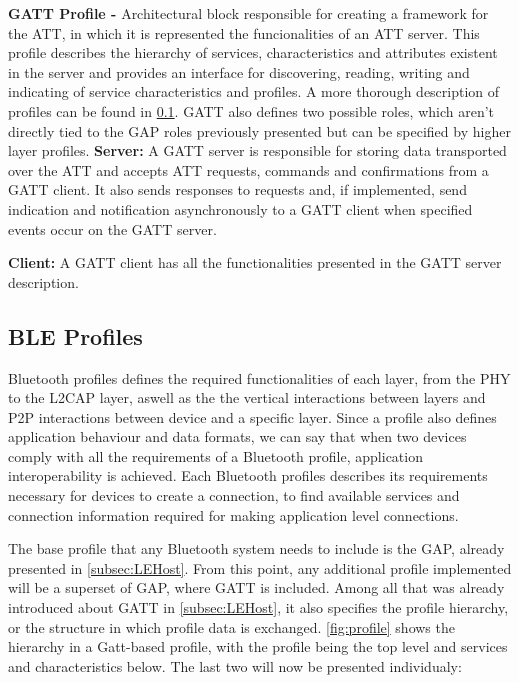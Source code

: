 \textbf{\ac{GATT} Profile -} Architectural block responsible for creating a framework for the \ac{ATT}, in which it is represented the funcionalities of an \ac{ATT} server. This profile describes the hierarchy of services, characteristics and attributes existent in the server and provides an interface for discovering, reading, writing and indicating of service characteristics and profiles. A more thorough description of profiles can be found in \ref{subsec:BLEProfile}. \ac{GATT} also defines two possible roles, which aren't directly tied to the \ac{GAP} roles previously presented but can be specified by higher layer profiles.
\tab \textbf{Server:} A \ac{GATT} server is responsible for storing data transported over the \ac{ATT} and accepts \ac{ATT} requests, commands and confirmations from a \ac{GATT} client. It also sends responses to requests and, if implemented, send indication and notification asynchronously to a \ac{GATT} client when specified events occur on the \ac{GATT} server.

\tab \textbf{Client:} A \ac{GATT} client has all the functionalities presented in the \ac{GATT} server description.

\subsection{\ac{BLE} Profiles}
\label{subsec:BLEProfile}


Bluetooth profiles defines the required functionalities of each layer, from the \ac{PHY} to the \ac{L2CAP} layer, aswell as the the vertical interactions between layers and \ac{P2P} interactions between device and a specific layer. Since a profile also defines application behaviour and data formats, we can say that when two devices comply with all the requirements of a Bluetooth profile, application interoperability is achieved. Each Bluetooth profiles describes its requirements necessary for devices to create a connection, to find available services and connection information required for making application level connections.

The base profile that any Bluetooth system needs to include is the \ac{GAP}, already presented in \ref{subsec:LEHost}. From this point, any additional profile implemented will be a superset of \ac{GAP}, where \ac{GATT} is included. Among all that was already introduced about \ac{GATT} in \ref{subsec:LEHost}, it also specifies the profile hierarchy, or the structure in which profile data is exchanged.  \ref{fig:profile} shows the hierarchy in a Gatt-based profile, with the profile being the top level and services and characteristics below. The last two will now be presented individualy:

